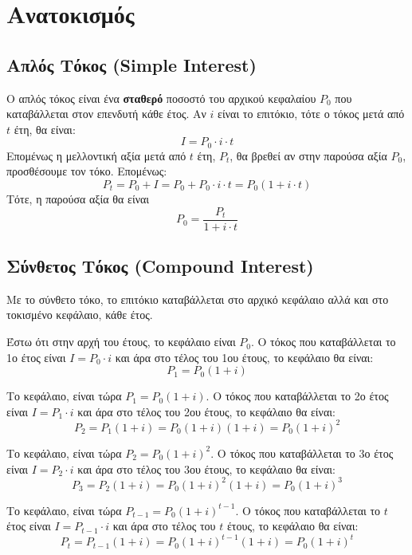 \documentclass[a4paper,table]{report}
\begin{document}
\chapter*{Ανατοκισμός}

\section*{Απλός Τόκος (Simple Interest)}

\begin{dfn}
  Ο \textcolor{Col1}{απλός τόκος} είναι ένα \textbf{σταθερό} ποσοστό του αρχικού 
  κεφαλαίου $ P_{0} $ που καταβάλλεται στον επενδυτή κάθε έτος. Αν $ i $ είναι το 
  επιτόκιο, τότε ο τόκος μετά από $t$ έτη, θα είναι:
  \[
    I=P_{0}\cdot i \cdot t 
  \] 
  Επομένως η μελλοντική αξία μετά από $t$ έτη, $ P_{t} $, θα βρεθεί αν στην παρούσα αξία
  $ P_{0} $, προσθέσουμε τον τόκο. Επομένως:
  \[
    P_{t} = P_{0} + I = P_{0} + P_{0}\cdot i\cdot t = P_{0}(1+i\cdot t)
  \] 
  Τότε, η παρούσα αξία θα είναι
  \[
    P_{0} = \frac{P_{t}}{1+ i \cdot t }  
  \] 
\end{dfn}



\section*{Σύνθετος Τόκος (Compound Interest)}

Με το \textcolor{Col1}{σύνθετο τόκο}, το επιτόκιο καταβάλλεται στο αρχικό κεφάλαιο αλλά 
και στο τοκισμένο κεφάλαιο, κάθε έτος. 
\begin{description}[widest=3ο Έτος,labelsep*=1ex,leftmargin=*]
  \item[1ο Έτος:] Έστω ότι στην αρχή του έτους, το κεφάλαιο είναι $ P_{0} $. Ο τόκος 
    που καταβάλλεται το 1ο έτος είναι $ I = P_{0} \cdot i $ και άρα στο τέλος του 
    1ου έτους, το κεφάλαιο θα είναι:
    \[
      P_{1} = P_{0} (1+i)  
    \] 
  \item [2ο Έτος:] Το κεφάλαιο, είναι τώρα $ P_{1}=P_{0}(1+i) $. Ο τόκος που 
    καταβάλλεται το 2ο έτος είναι $ I = P_{1}\cdot i $ και άρα στο τέλος του 
    2ου έτους, το κεφάλαιο θα είναι:
    \[
      P_{2} = P_{1}(1+i) = P_{0}(1+i)(1+i) = P_{0} (1+i)^{2} 
    \] 
  \item [3ο Έτος:] Το κεφάλαιο, είναι τώρα $ P_{2}=P_{0}(1+i)^{2} $. Ο τόκος που 
    καταβάλλεται το 3ο έτος είναι $ I = P_{2}\cdot i $ και άρα στο τέλος του 
    3ου έτους, το κεφάλαιο θα είναι:
    \[
      P_{3} = P_{2}(1+i) = P_{0}(1+i)^{2}(1+i) = P_{0} (1+i)^{3} 
    \] 
  \item [$t$ Έτος:] Το κεφάλαιο, είναι τώρα $ P_{t-1}=P_{0}(1+i)^{t-1} $. Ο τόκος που 
    καταβάλλεται το $t$ έτος είναι $ I = P_{t-1}\cdot i $ και άρα στο τέλος του 
    $t$ έτους, το κεφάλαιο θα είναι:
    \[
      P_{t} = P_{t-1}(1+i) = P_{0}(1+i)^{t-1}(1+i) = P_{0} (1+i)^{t} 
    \] 
\end{description}
\end{document}
